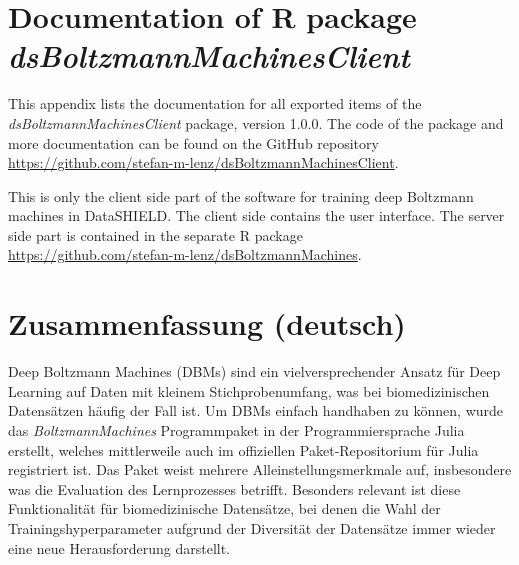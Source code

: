 \documentclass[12pt]{article}
\newcommand{\apkg}[1]{\emph{#1}}
\begin{document}
\begin{appendices}


\clearpage
\section[Documentation of R package \apkg{dsBoltzmannMachinesClient}]{Documentation of R package \\ \apkg{dsBoltzmannMachinesClient}}\label{dsbmsdoku}
This appendix lists the documentation for all exported items of the \apkg{dsBoltzmannMachinesClient} package, version 1.0.0. %
The code of the package and more documentation can be found on the GitHub repository\\ \url{https://github.com/stefan-m-lenz/dsBoltzmannMachinesClient}.

This is only the client side part of the software for training deep Boltzmann machines in DataSHIELD. The client side contains the user interface. The server side part is contained in the separate R package \\
\url{https://github.com/stefan-m-lenz/dsBoltzmannMachines}.


\clearpage
\section{Zusammenfassung (deutsch)}
Deep Boltzmann Machines (DBMs) sind ein vielversprechender Ansatz für Deep Learning auf Daten mit kleinem Stichprobenumfang, was bei biomedizinischen Datensätzen häufig der Fall ist.
Um DBMs einfach handhaben zu können, wurde das \apkg{BoltzmannMachines} Programmpaket in der Programmiersprache Julia erstellt, welches mittlerweile auch im offiziellen Paket-Repositorium für Julia registriert ist.
Das Paket weist mehrere Alleinstellungsmerkmale auf, insbesondere was die Evaluation des Lernprozesses betrifft.
Besonders relevant ist diese Funktionalität für biomedizinische Datensätze, bei denen die Wahl der Trainingshyperparameter aufgrund der Diversität der Datensätze immer wieder eine neue Herausforderung darstellt.


\end{appendices}
\end{document}

